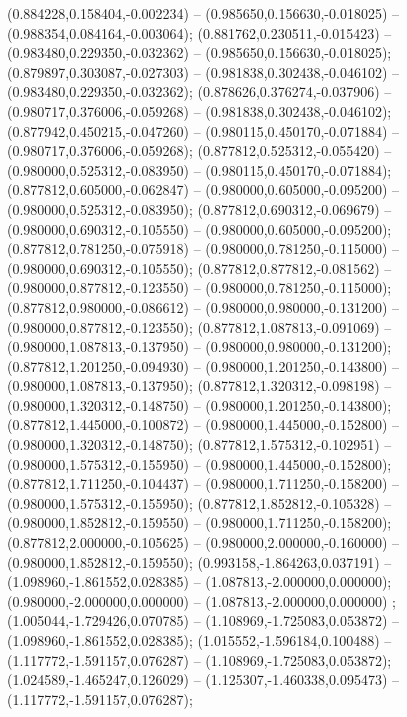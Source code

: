  (0.884228,0.158404,-0.002234) -- (0.985650,0.156630,-0.018025) -- (0.988354,0.084164,-0.003064);
 (0.881762,0.230511,-0.015423) -- (0.983480,0.229350,-0.032362) -- (0.985650,0.156630,-0.018025);
 (0.879897,0.303087,-0.027303) -- (0.981838,0.302438,-0.046102) -- (0.983480,0.229350,-0.032362);
 (0.878626,0.376274,-0.037906) -- (0.980717,0.376006,-0.059268) -- (0.981838,0.302438,-0.046102);
 (0.877942,0.450215,-0.047260) -- (0.980115,0.450170,-0.071884) -- (0.980717,0.376006,-0.059268);
 (0.877812,0.525312,-0.055420) -- (0.980000,0.525312,-0.083950) -- (0.980115,0.450170,-0.071884);
 (0.877812,0.605000,-0.062847) -- (0.980000,0.605000,-0.095200) -- (0.980000,0.525312,-0.083950);
 (0.877812,0.690312,-0.069679) -- (0.980000,0.690312,-0.105550) -- (0.980000,0.605000,-0.095200);
 (0.877812,0.781250,-0.075918) -- (0.980000,0.781250,-0.115000) -- (0.980000,0.690312,-0.105550);
 (0.877812,0.877812,-0.081562) -- (0.980000,0.877812,-0.123550) -- (0.980000,0.781250,-0.115000);
 (0.877812,0.980000,-0.086612) -- (0.980000,0.980000,-0.131200) -- (0.980000,0.877812,-0.123550);
 (0.877812,1.087813,-0.091069) -- (0.980000,1.087813,-0.137950) -- (0.980000,0.980000,-0.131200);
 (0.877812,1.201250,-0.094930) -- (0.980000,1.201250,-0.143800) -- (0.980000,1.087813,-0.137950);
 (0.877812,1.320312,-0.098198) -- (0.980000,1.320312,-0.148750) -- (0.980000,1.201250,-0.143800);
 (0.877812,1.445000,-0.100872) -- (0.980000,1.445000,-0.152800) -- (0.980000,1.320312,-0.148750);
 (0.877812,1.575312,-0.102951) -- (0.980000,1.575312,-0.155950) -- (0.980000,1.445000,-0.152800);
 (0.877812,1.711250,-0.104437) -- (0.980000,1.711250,-0.158200) -- (0.980000,1.575312,-0.155950);
 (0.877812,1.852812,-0.105328) -- (0.980000,1.852812,-0.159550) -- (0.980000,1.711250,-0.158200);
 (0.877812,2.000000,-0.105625) -- (0.980000,2.000000,-0.160000) -- (0.980000,1.852812,-0.159550);
 (0.993158,-1.864263,0.037191) -- (1.098960,-1.861552,0.028385) -- (1.087813,-2.000000,0.000000);
 (0.980000,-2.000000,0.000000) -- (1.087813,-2.000000,0.000000) ;
 (1.005044,-1.729426,0.070785) -- (1.108969,-1.725083,0.053872) -- (1.098960,-1.861552,0.028385);
 (1.015552,-1.596184,0.100488) -- (1.117772,-1.591157,0.076287) -- (1.108969,-1.725083,0.053872);
 (1.024589,-1.465247,0.126029) -- (1.125307,-1.460338,0.095473) -- (1.117772,-1.591157,0.076287);
